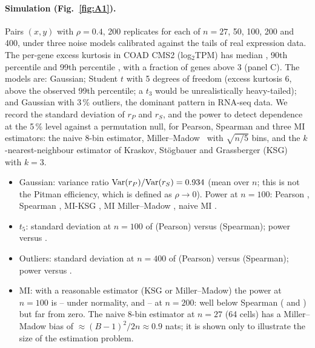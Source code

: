 \documentclass[11pt,a4paper]{article}
\theoremstyle{plain}
\theoremstyle{remark}
\begin{document}
\paragraph{Simulation (Fig.~\ref{fig:A1}).} Pairs $(x,y)$ with $\rho=0.4$, 200 replicates for
each of $n=27$, 50, 100, 200 and 400, under three noise models calibrated against the tails of real
expression data. The per-gene excess kurtosis in COAD CMS2 (log$_2$TPM) has median
\AOnerealkurtosisqFiveZero{}, 90th percentile \AOnerealkurtosisqNineZero{} and 99th percentile
\AOnerealkurtosisqNineNine{}, with a fraction \AOnerealkurtosisfracgtThree{} of genes above 3
(panel C). The models are: Gaussian; Student $t$ with 5 degrees of freedom (excess kurtosis 6,
above the observed 99th percentile; a $t_3$ would be unrealistically heavy-tailed); and Gaussian
with 3\,\% outliers, the dominant pattern in RNA-seq data. We record the standard deviation of
$r_P$ and $r_S$, and the power to detect dependence at the 5\,\% level against a permutation
null, for Pearson, Spearman and three MI estimators: the naive 8-bin estimator, Miller--Madow~\cite{miller1955}
with $\sqrt{n/5}$ bins, and the $k$-nearest-neighbour estimator of Kraskov, St\"ogbauer and
Grassberger (KSG)~\cite{kraskov2004} with $k=3$.
\begin{itemize}
  \item Gaussian: variance ratio $\mathrm{Var}(r_P)/\mathrm{Var}(r_S)=0.934$
  (mean over $n$; this is not the Pitman efficiency, which is defined as $\rho\to0$). Power at
  $n=100$: Pearson \AOnegaussiannOneZeroZeropearsonpower, Spearman \AOnegaussiannOneZeroZerospearmanpower,
  MI-KSG \AOnegaussiannOneZeroZeromiksgpower, MI Miller--Madow \AOnegaussiannOneZeroZeromimmpower,
  naive MI \AOnegaussiannOneZeroZeromibinspower.
  \item $t_5$: standard deviation at $n=100$ of \AOnetFivenOneZeroZeropearsonsd{} (Pearson)
  versus \AOnetFivenOneZeroZerospearmansd{} (Spearman); power \AOnetFivenOneZeroZeropearsonpower{}
  versus \AOnetFivenOneZeroZerospearmanpower.
  \item Outliers: standard deviation at $n=400$ of \AOneoutliersnFourZeroZeropearsonsd{}
  (Pearson) versus \AOneoutliersnFourZeroZerospearmansd{} (Spearman); power
  \AOneoutliersnFourZeroZeropearsonpower{} versus \AOneoutliersnFourZeroZerospearmanpower.
  \item MI: with a reasonable estimator (KSG or Miller--Madow) the power at $n=100$ is
  \AOnegaussiannOneZeroZeromiksgpower--\AOnegaussiannOneZeroZeromimmpower{} under normality,
  and \AOnegaussiannTwoZeroZeromiksgpower--\AOnegaussiannTwoZeroZeromimmpower{} at $n=200$:
  well below Spearman (\AOnegaussiannOneZeroZerospearmanpower{} and
  \AOnegaussiannTwoZeroZerospearmanpower) but far from zero. The naive 8-bin estimator at
  $n=27$ (64 cells) has a Miller--Madow bias of $\approx (B-1)^2/2n\approx 0.9$ nats; it is
  shown only to illustrate the size of the estimation problem.
\end{itemize}
\end{document}
